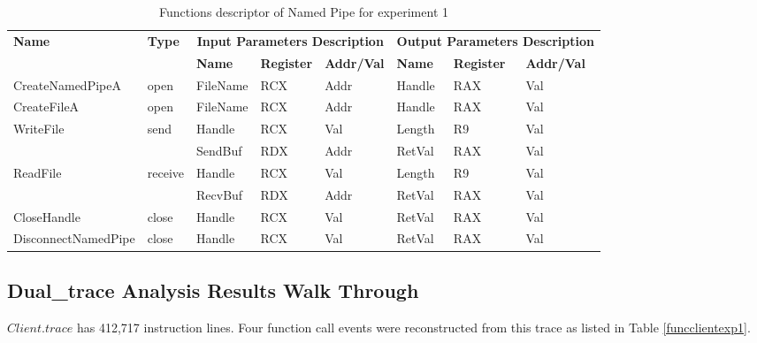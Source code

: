 \begin{table}[H]
  \centering
  \caption{Functions descriptor of Named Pipe for experiment 1}
  \label{fdescexp1}
  \begin{tabular}{|l|l|l|l|l|l|l|l|}
\hline
             \multirow{2}{*}{{\textbf{Name}}} & \multirow{2}{*}{{\textbf{Type}}} & \multicolumn{3}{c|}{\textbf{Input Parameters Description}} & \multicolumn{3}{c|}{\textbf{Output Parameters Description}} \\
              \cline{3-8} 
             & & \textbf{Name}& \textbf{Register} & \textbf{Addr/Val} & \textbf{Name}& \textbf{Register} &  \textbf{Addr/Val}  \\
             \hline
      CreateNamedPipeA
       &open & FileName & RCX  & Addr &  Handle & RAX & Val\\
      \hline         
      CreateFileA
       &open & FileName & RCX & Addr&  Handle & RAX & Val\\ 
      \hline              
      \multirow{2}{*}{WriteFile}
       &\multirow{2}{*}{send} &  Handle & RCX & Val & Length& R9 &Val\\
        \cline{3-8} 
       & & SendBuf & RDX & Addr & RetVal& RAX & Val\\
      \hline            
      \multirow{2}{*}{ReadFile}
       &\multirow{2}{*}{receive} &  Handle & RCX & Val& Length &R9 & Val\\
        \cline{3-8} 
       & & RecvBuf & RDX  & Addr & RetVal& RAX & Val\\
      \hline            
      CloseHandle &
       close &  Handle & RCX & Val & RetVal& RAX & Val\\
      \hline            
      DisconnectNamedPipe &
      close &  Handle & RCX & Val & RetVal& RAX & Val\\
      \hline               
  \end{tabular}
\end{table}


\subsection{Dual\_trace Analysis Results Walk Through}
$Client.trace$ has 412,717 instruction lines. Four function call events were reconstructed from this trace as listed in Table \ref{funcclientexp1}.

